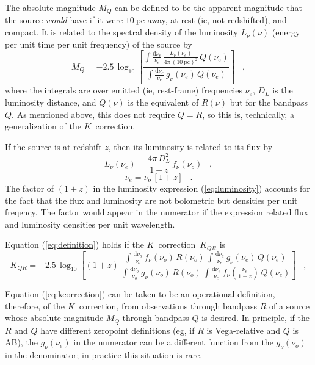 \documentclass[preprint]{aastex}
\newcommand{\kcorrection}{$K$~correction}
\newcommand{\nuobs}{\nu_o}
\newcommand{\nuemit}{\nu_e}
\begin{document}
The absolute magnitude $M_Q$ can be defined to be the apparent
magnitude that the source \emph{would} have if it were
$10~\mathrm{pc}$ away, at rest (ie, not redshifted), and compact.  It
is related to the spectral density of the luminosity $L_{\nu}(\nu)$
(energy per unit time per unit frequency) of the source by
\begin{equation}
M_Q = -2.5\,\log_{10}\left[
  \frac{\displaystyle
          \int\frac{\mathrm{d}\nuemit}{\nuemit}\,
              \frac{L_{\nu}(\nuemit)}{4\pi\,(10~\mathrm{pc})^2}\,Q(\nuemit)}
       {\displaystyle
          \int\frac{\mathrm{d}\nuemit}{\nuemit}\,g_{\nu}(\nuemit)\,Q(\nuemit)}
\right] \;\;\;,
\end{equation}
where the integrals are over emitted (ie, rest-frame) frequencies
$\nuemit$, $D_L$ is the luminosity distance, and $Q(\nu)$ is the
equivalent of $R(\nu)$ but for the bandpass $Q$.  As mentioned above,
this does not require $Q=R$, so this is, technically, a generalization
of the \kcorrection.

If the source is at redshift $z$, then its luminosity is related to
its flux by
\begin{equation}
\label{eq:luminosity}
L_{\nu}(\nuemit) = \frac{4\pi\,D_L^2}{1+z}\,f_{\nu}(\nuobs) \;\;\;,
\end{equation}
\begin{equation}
\nuemit = \nuobs\,[1+z] \;\;\;.
\end{equation}
The factor of $(1+z)$ in the luminosity expression
(\ref{eq:luminosity}) accounts for the fact that the flux and
luminosity are not bolometric but densities per unit freqency.  The
factor would appear in the numerator if the expression related flux
and luminosity densities per unit wavelength.

Equation (\ref{eq:definition}) holds if the \kcorrection\ $K_{QR}$ is
\begin{equation}
\label{eq:kcorrection}
K_{QR} = -2.5\,\log_{10}\left[(1+z)\,
  \frac{\displaystyle
          \int\frac{\mathrm{d}\nuobs}{\nuobs}\,f_{\nu}(\nuobs)\,R(\nuobs)\,
          \int\frac{\mathrm{d}\nuemit}{\nuemit}\,g_{\nu}(\nuemit)\,Q(\nuemit)}
       {\displaystyle
          \int\frac{\mathrm{d}\nuobs}{\nuobs}\,g_{\nu}(\nuobs)\,R(\nuobs)\,
          \int\frac{\mathrm{d}\nuemit}{\nuemit}\,
            f_{\nu}\left(\frac{\nuemit}{1+z}\right)\,Q(\nuemit)}
\right] \;\;\;,
\end{equation}

Equation (\ref{eq:kcorrection}) can be taken to be an operational
definition, therefore, of the \kcorrection, from observations through
bandpass $R$ of a source whose absolute magnitude $M_Q$ through
bandpass $Q$ is desired.  In principle, if the $R$ and $Q$ have
different zeropoint definitions (eg, if $R$ is Vega-relative and $Q$
is AB), the $g_{\nu}(\nuemit)$ in the numerator can be a different
function from the $g_{\nu}(\nuobs)$ in the denominator; in practice
this situation is rare.
\end{document}
